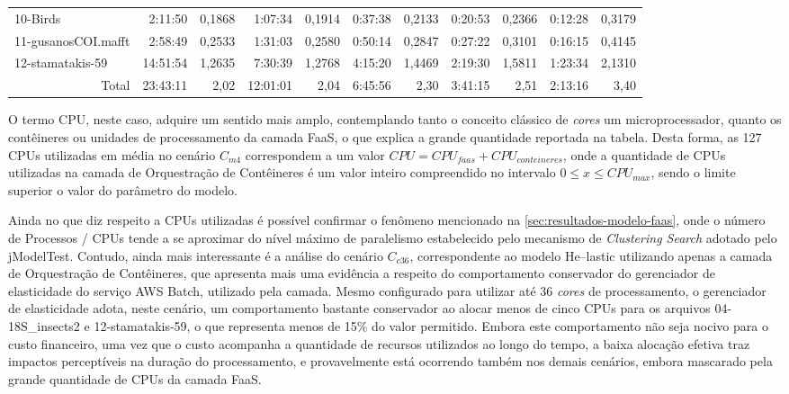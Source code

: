 \documentclass[english,brazilian]{UNISINOSmonografia} %
\begin{document}
{\begin{landscape}
\begin{table}
\begin{minipage}{\linewidth}
\begin{tabular*}{\linewidth}{@{\extracolsep{\fill}}lrrrrrrrrrr@{}}
					10-Birds & 2:11:50 & 0,1868 & 1:07:34 & 0,1914 & 0:37:38 & 0,2133 & 0:20:53 & 0,2366 & 0:12:28 & 0,3179 \\
					11-gusanosCOI.mafft & 2:58:49 & 0,2533 & 1:31:03 & 0,2580 & 0:50:14 & 0,2847 & 0:27:22 & 0,3101 & 0:16:15 & 0,4145 \\
					12-stamatakis-59 & 14:51:54 & 1,2635 & 7:30:39 & 1,2768 & 4:15:20 & 1,4469 & 2:19:30 & 1,5811 & 1:23:34 & 2,1310 \\
					\bottomrule
					\multicolumn{1}{r}{Total} & 23:43:11 & 2,02 & 12:01:01 & 2,04 & 6:45:56 & 2,30 & 3:41:15 & 2,51 & 2:13:16 & 3,40
				\end{tabular*}
			\end{minipage}
		\end{table}
	\end{landscape}
}



O termo CPU, neste caso, adquire um sentido mais amplo, contemplando tanto o conceito clássico de \textit{cores} um microprocessador, quanto os contêineres ou unidades de processamento da camada FaaS, o que explica a grande quantidade reportada na tabela.
%
Desta forma, as 127 CPUs utilizadas em média no cenário $C_{m4}$ correspondem a um valor $ CPU = CPU_{faas} + CPU_{conteineres} $, onde a quantidade de CPUs utilizadas na camada de Orquestração de Contêineres é um valor inteiro compreendido no intervalo $ 0 \le x \le CPU_{max} $, sendo o limite superior o valor do parâmetro do modelo.





Ainda no que diz respeito a CPUs utilizadas é possível confirmar o fenômeno mencionado na \autoref{sec:resultados-modelo-faas}, onde o número de Processos / CPUs tende a se aproximar do nível máximo de paralelismo estabelecido pelo mecanismo de \textit{Clustering Search} adotado pelo jModelTest.
%
Contudo, ainda mais interessante é a análise do cenário $C_{c36}$, correspondente ao modelo \textsf{He}--lastic utilizando apenas a camada de Orquestração de Contêineres, que apresenta mais uma evidência a respeito do comportamento conservador do gerenciador de elasticidade do serviço AWS Batch, utilizado pela camada.
%
Mesmo configurado para utilizar até 36 \textit{cores} de processamento, o gerenciador de elasticidade adota, neste cenário, um comportamento bastante conservador ao alocar menos de cinco CPUs para os arquivos 04-18S\_insects2 e 12-stamatakis-59, o que representa menos de 15\% do valor permitido.
%
Embora este comportamento não seja nocivo para o custo financeiro, uma vez que o custo acompanha a quantidade de recursos utilizados ao longo do tempo, a baixa alocação efetiva traz impactos perceptíveis na duração do processamento, e provavelmente está ocorrendo também nos demais cenários, embora mascarado pela grande quantidade de CPUs da camada FaaS.
\end{document}
